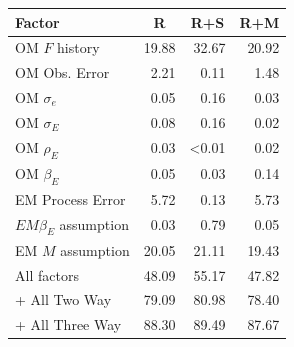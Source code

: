 \begin{center}
\begin{tabular}{lrrr}
\hline\hline
\multicolumn{1}{l}{Factor}&\multicolumn{1}{c}{R}&\multicolumn{1}{c}{R+S}&\multicolumn{1}{c}{R+M}\tabularnewline
\hline
OM $F$ history&19.88&32.67&20.92\tabularnewline
OM Obs. Error& 2.21& 0.11& 1.48\tabularnewline
OM $\sigma_e$& 0.05& 0.16& 0.03\tabularnewline
OM $\sigma_E$& 0.08& 0.16& 0.02\tabularnewline
OM $\rho_{E}$& 0.03&\textless  0.01& 0.02\tabularnewline
OM $\beta_{E}$& 0.05& 0.03& 0.14\tabularnewline
EM Process Error& 5.72& 0.13& 5.73\tabularnewline
$EM \beta_{E}$ assumption& 0.03& 0.79& 0.05\tabularnewline
EM $M$ assumption&20.05&21.11&19.43\tabularnewline
All factors&48.09&55.17&47.82\tabularnewline
+ All Two Way&79.09&80.98&78.40\tabularnewline
+ All Three Way&88.30&89.49&87.67\tabularnewline
\hline
\end{tabular}\end{center}
